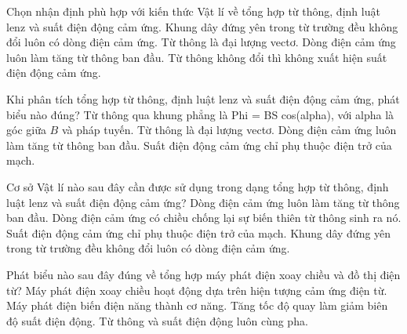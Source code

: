 \begin{ex}
Chọn nhận định phù hợp với kiến thức Vật lí về tổng hợp từ thông, định luật lenz và suất điện động cảm ứng.
\choice
{Khung dây đứng yên trong từ trường đều không đổi luôn có dòng điện cảm ứng.}
{Từ thông là đại lượng vectơ.}
{Dòng điện cảm ứng luôn làm tăng từ thông ban đầu.}
{\True Từ thông không đổi thì không xuất hiện suất điện động cảm ứng.}
\end{ex}

\begin{ex}
Khi phân tích tổng hợp từ thông, định luật lenz và suất điện động cảm ứng, phát biểu nào đúng?
\choice
{\True Từ thông qua khung phẳng là Phi = BS cos(alpha), với alpha là góc giữa $B$ và pháp tuyến.}
{Từ thông là đại lượng vectơ.}
{Dòng điện cảm ứng luôn làm tăng từ thông ban đầu.}
{Suất điện động cảm ứng chỉ phụ thuộc điện trở của mạch.}
\end{ex}

\begin{ex}
Cơ sở Vật lí nào sau đây cần được sử dụng trong dạng tổng hợp từ thông, định luật lenz và suất điện động cảm ứng?
\choice
{Dòng điện cảm ứng luôn làm tăng từ thông ban đầu.}
{\True Dòng điện cảm ứng có chiều chống lại sự biến thiên từ thông sinh ra nó.}
{Suất điện động cảm ứng chỉ phụ thuộc điện trở của mạch.}
{Khung dây đứng yên trong từ trường đều không đổi luôn có dòng điện cảm ứng.}
\end{ex}

\begin{ex}
Phát biểu nào sau đây đúng về tổng hợp máy phát điện xoay chiều và đồ thị điện từ?
\choice
{\True Máy phát điện xoay chiều hoạt động dựa trên hiện tượng cảm ứng điện từ.}
{Máy phát điện biến điện năng thành cơ năng.}
{Tăng tốc độ quay làm giảm biên độ suất điện động.}
{Từ thông và suất điện động luôn cùng pha.}
\end{ex}

